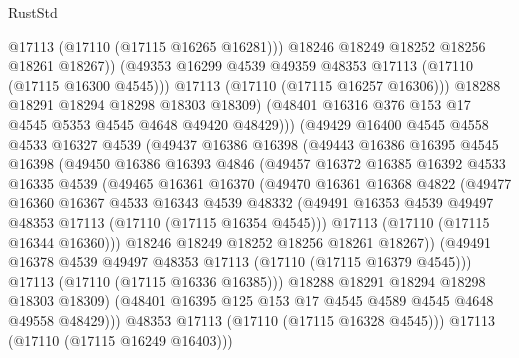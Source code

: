 \begin{lexlean}{RustStd}
\begin{coremodule}
                        @17113
                        (@17110 (@17115 @16265 @16281)))
                      @18246
                      @18249
                      @18252
                      @18256
                      @18261
                      @18267))
                  (@49353 @16299 @4539 @49359 @48353 @17113 (@17110 (@17115 @16300 @4545)))
                  @17113
                  (@17110 (@17115 @16257 @16306)))
                @18288
                @18291
                @18294
                @18298
                @18303
                @18309)
              (@48401 @16316 @376 @153 @17 @4545 @5353 @4545 @4648 @49420 @48429)))
          (@49429
            @16400
            @4545
            @4558
            @4533
            @16327
            @4539
            (@49437
              @16386
              @16398
              (@49443
                @16386
                @16395
                @4545
                @16398
                (@49450
                  @16386
                  @16393
                  @4846
                  (@49457
                    @16372
                    @16385
                    @16392
                    @4533
                    @16335
                    @4539
                    (@49465
                      @16361
                      @16370
                      (@49470
                        @16361
                        @16368
                        @4822
                        (@49477
                          @16360
                          @16367
                          @4533
                          @16343
                          @4539
                          @48332
                          (@49491 @16353 @4539 @49497 @48353 @17113 (@17110 (@17115 @16354 @4545)))
                          @17113
                          (@17110 (@17115 @16344 @16360)))
                        @18246
                        @18249
                        @18252
                        @18256
                        @18261
                        @18267))
                    (@49491 @16378 @4539 @49497 @48353 @17113 (@17110 (@17115 @16379 @4545)))
                    @17113
                    (@17110 (@17115 @16336 @16385)))
                  @18288
                  @18291
                  @18294
                  @18298
                  @18303
                  @18309)
                (@48401 @16395 @125 @153 @17 @4545 @4589 @4545 @4648 @49558 @48429)))
            @48353
            @17113
            (@17110 (@17115 @16328 @4545)))
          @17113
          (@17110 (@17115 @16249 @16403)))

\end{coremodule}
\end{lexlean}
